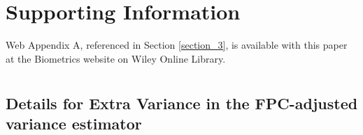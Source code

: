 \documentclass[useAMS,usenatbib,referee]{biom}
\begin{document}
%
 








\section*{Supporting Information}

Web Appendix A, referenced in Section \ref{section_3}, is available with
this paper at the Biometrics website on Wiley Online
Library.\vspace*{-8pt}

\appendix


\section{}
\subsection{Details for Extra Variance in the FPC-adjusted variance estimator}\label{Apendix_1}
\end{document}
